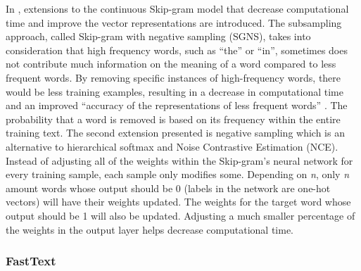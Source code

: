 In \citet{mikolov2013distributed}, extensions to the continuous Skip-gram model that decrease computational time and improve the vector representations are introduced. The subsampling approach, called Skip-gram with negative sampling (SGNS), takes into consideration that high frequency words, such as “the” or “in”, sometimes does not contribute much information on the meaning of a word compared to less frequent words. By removing specific instances of high-frequency words, there would be less training examples, resulting in a decrease in computational time and an improved “accuracy of the representations of less frequent words” \citep{mikolov2013distributed}. The probability that a word is removed is based on its frequency within the entire training text. The second extension presented is negative sampling which is an alternative to hierarchical softmax and Noise Contrastive Estimation (NCE). Instead of adjusting all of the weights within the Skip-gram’s neural network for every training sample, each sample only modifies some. Depending on \emph{n}, only \emph{n} amount words whose output should be 0 (labels in the network are one-hot vectors) will have their weights updated. The weights for the target word whose output should be 1 will also be updated. Adjusting a much smaller percentage of the weights in the output layer helps decrease computational time.


\subsubsection{FastText}

